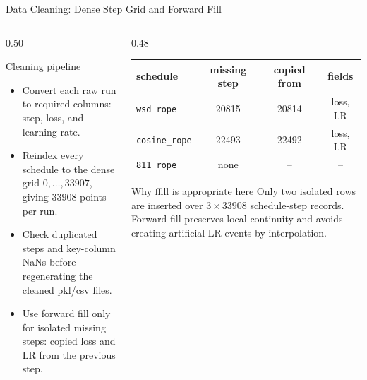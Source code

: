 \documentclass[fontset=fandol,aspectratio=169,10pt]{ctexbeamer}
\begin{document}
\begin{frame}{Data Cleaning: Dense Step Grid and Forward Fill}
  \begin{columns}[T,onlytextwidth]
    \begin{column}{0.50\textwidth}
      \begin{block}{Cleaning pipeline}
        \begin{itemize}
          \item Convert each raw run to required columns: step, loss, and learning rate.
          \item Reindex every schedule to the dense grid \(0,\ldots,33907\), giving \(33908\) points per run.
          \item Check duplicated steps and key-column NaNs before regenerating the cleaned pkl/csv files.
          \item Use forward fill only for isolated missing steps: copied loss and LR from the previous step.
        \end{itemize}
      \end{block}
    \end{column}
    \begin{column}{0.48\textwidth}
      \begin{table}
        \centering
        \scriptsize
        \begin{tabular*}{0.92\linewidth}{@{\extracolsep{\fill}}lccc}
          \toprule
          schedule & missing step & copied from & fields\\
          \midrule
          \texttt{wsd\_rope} & 20815 & 20814 & loss, LR\\
          \texttt{cosine\_rope} & 22493 & 22492 & loss, LR\\
          \texttt{811\_rope} & none & -- & --\\
          \bottomrule
        \end{tabular*}
      \end{table}
      \begin{block}{Why ffill is appropriate here}
        Only two isolated rows are inserted over \(3\times33908\) schedule-step
        records. Forward fill preserves local continuity and avoids creating
        artificial LR events by interpolation.
      \end{block}
    \end{column}
  \end{columns}
\end{frame}
\end{document}
